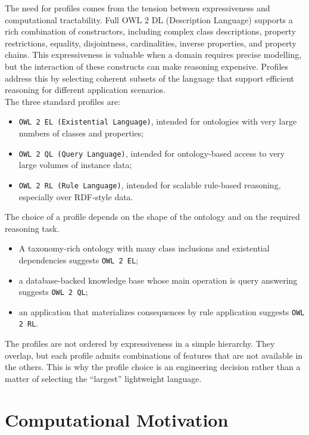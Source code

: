 \documentclass{scrbook}
\begin{document}
	The need for profiles comes from the tension between expressiveness and computational tractability. Full OWL 2 DL (Description Language) supports a rich combination of constructors, including complex class descriptions, property restrictions, equality, disjointness, cardinalities, inverse properties, and property chains. This expressiveness is valuable when a domain requires precise modelling, but the interaction of these constructs can make reasoning expensive. Profiles address this by selecting coherent subsets of the language that support efficient reasoning for different application scenarios.\\
	
	The three standard profiles are:
	\begin{itemize}
		\item \texttt{OWL 2 EL (Existential Language)}, intended for ontologies with very large numbers of classes and properties;
		\item \texttt{OWL 2 QL (Query Language)}, intended for ontology-based access to very large volumes of instance data;
		\item \texttt{OWL 2 RL (Rule Language)}, intended for scalable rule-based reasoning, especially over RDF-style data.
	\end{itemize}
	
	The choice of a profile depends on the shape of the ontology and on the required reasoning task.
	\begin{itemize}
		\item A taxonomy-rich ontology with many class inclusions and existential dependencies suggests \texttt{OWL 2 EL};
		\item a database-backed knowledge base whose main operation is query answering suggests \texttt{OWL 2 QL};
		\item an application that materializes consequences by rule application suggests \texttt{OWL 2 RL}.
	\end{itemize}
	
	The profiles are not ordered by expressiveness in a simple hierarchy. They overlap, but each profile admits combinations of features that are not available in the others. This is why the profile choice is an engineering decision rather than a matter of selecting the ``largest'' lightweight language.
	
	\section{Computational Motivation}
	
\end{document}
